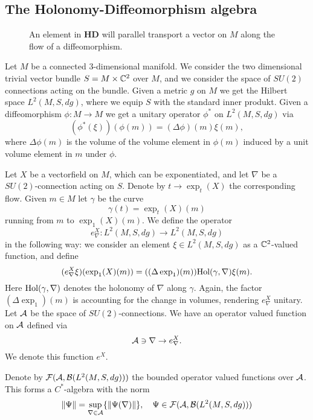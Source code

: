 \documentclass[12pt]{article}
\def\ca{{\cal A}}
\def\cb{{\cal B}}
\def\cf{{\cal F}}
\newcommand{\C}{{\Bbb C}}
\begin{document}
\subsection{The Holonomy-Diffeomorphism algebra}
\label{beent}


\begin{figure}[t]
\begin{center}
\resizebox{!}{4.5cm}{
 }
\end{center}
\caption{An element in $\mathbf{H D}$ will parallel transport a vector on $M$ along the flow of a diffeomorphism.}
\label{lenin}
\end{figure}


Let $M$ be a connected $3$-dimensional manifold. We consider the two dimensional trivial vector bundle $S=M\times \C^2$ over $M$, and we consider the space of $SU(2)$ connections acting on the bundle. Given a metric $g$ on $M$ we get the Hilbert space $L^2(M,S,dg)$, where we equip $S$ with the standard inner produkt. Given a diffeomorphism $\phi:M\to M$ we get a unitary operator $\phi^*$ on  $L^2(M,S,dg)$ via
$$( \phi^* (\xi ))(\phi (m) )= (\Delta \phi )(m)  \xi (m) , $$
where  $\Delta \phi (m)$ is the volume of the volume element in $\phi (m)$ induced by a unit volume element in $ m$ under $\phi $.      

Let $X$ be a vectorfield on $M$, which can be exponentiated, and let $\nabla$ be a $SU(2)$-connection acting on $S$.  Denote by $t\to \exp_t(X)$ the corresponding flow. Given $m\in M$ let $\gamma$ be the curve  
$$\gamma (t)=\exp_{t} (X) (m) $$
running from $m$ to $\exp_1 (X)(m)$. We define the operator 
$$e^X_\nabla :L^2 (M , S, dg) \to L^2 (M ,  S , dg)$$
in the following way:
we consider an element $\xi \in L^2 (M ,  S, dg)$ as a $\C^2$-valued function, and define 
$$  (e^X_\nabla \xi )(\exp_1(X) (m))=  ((\Delta \exp_1) (m))  \hbox{Hol}(\gamma, \nabla) \xi (m)   .$$
Here  $\hbox{Hol}(\gamma, \nabla)$ denotes the holonomy of $\nabla$ along $\gamma$. Again, the factor $(\Delta \exp_1) (m)$ is accounting for the change in volumes, rendering $e^X_\nabla$ unitary.  \\

Let $\ca$ be the space of $SU(2)$-connections. We have an operator valued function on $\ca$ defined via 
$$\ca \ni \nabla \to e^X_\nabla  . $$
We denote this function $e^X$. 

Denote by $\cf (\ca , \cb (L^2(M, S,dg) ))$ the bounded operator valued functions over $\ca$. This forms a $C^*$-algebra with the norm
$$\| \Psi \| =  \sup_{\nabla \in \ca} \{\|  \Psi (\nabla )\| \}, \quad \Psi \in  \cf (\ca , \cb (L^2(M, S,dg )) ) $$ 
    
\end{document}
